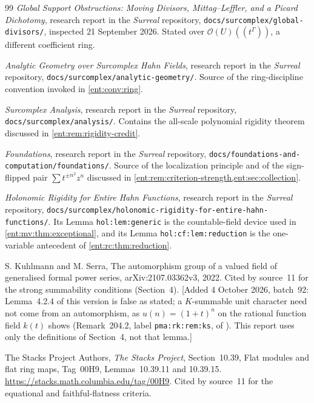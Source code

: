 \documentclass[11pt]{article}
\theoremstyle{plain}
\theoremstyle{plain}
\theoremstyle{plain}
\theoremstyle{definition}
\theoremstyle{definition}
\theoremstyle{definition}
\theoremstyle{definition}
\theoremstyle{remark}
\begin{document}
\begin{thebibliography}{99}
\emph{Global Support Obstructions: Moving Divisors, Mittag--Leffler, and a
Picard Dichotomy}, research report in the \emph{Surreal} repository,
\texttt{docs/surcomplex/global-divisors/}, inspected 21 September 2026.
Stated over $\mathcal O(U)((t^\Gamma))$, a different coefficient ring.

\emph{Analytic Geometry over Surcomplex Hahn Fields}, research report in the
\emph{Surreal} repository, \texttt{docs/surcomplex/analytic-geometry/}.
Source of the ring-discipline convention invoked in \cref{ent:conv:ring}.

\emph{Surcomplex Analysis}, research report in the \emph{Surreal}
repository, \texttt{docs/surcomplex/analysis/}. Contains the all-scale
polynomial rigidity theorem discussed in \cref{ent:rem:rigidity-credit}.

\emph{Foundations}, research report in the \emph{Surreal} repository,
\texttt{docs/foundations-and-computation/foundations/}. Source of the
localization principle and of the sign-flipped pair
$\sum t^{\pm n^2}z^n$ discussed in
\cref{ent:rem:criterion-strength,ent:sec:collection}.

\emph{Holonomic Rigidity for Entire Hahn Functions}, research report in the
\emph{Surreal} repository,
\texttt{docs/surcomplex/holonomic-rigidity-for-entire-hahn-functions/}. Its
Lemma \texttt{hol:lem:generic} is the countable-field device used in
\cref{ent:mv:thm:exceptional}, and its Lemma \texttt{hol:cf:lem:reduction} is
the one-variable antecedent of \cref{ent:rc:thm:reduction}.

S. Kuhlmann and M. Serra, The automorphism group of a valued field of
generalised formal power series, arXiv:2107.03362v3, 2022. Cited by source~11
for the strong summability conditions (Section~4).
[Added 4 October 2026, batch~92: Lemma~4.2.4 of this version is false as
stated; a $K$-summable unit character need not come from an automorphism, as
$u(n)=(1+t)^n$ on the rational function field $k(t)$ shows (Remark~204.2,
label \texttt{pma:rk:rem:ks}, of
).
This report uses only the definitions of Section~4, not that lemma.]

The Stacks Project Authors, \emph{The Stacks Project}, Section~10.39, Flat
modules and flat ring maps, Tag~00H9, Lemmas~10.39.11 and 10.39.15.
\url{https://stacks.math.columbia.edu/tag/00H9}. Cited by source~11 for the
equational and faithful-flatness criteria.


\end{thebibliography}
\end{document}
